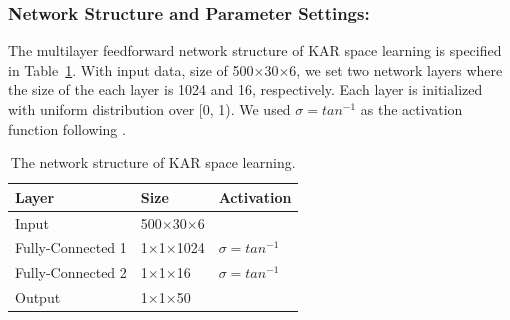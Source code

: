 \documentclass{sig-alternate-05-2015}
\begin{document}
\subsubsection{Network Structure and Parameter Settings:}
The multilayer feedforward network structure of KAR space learning is specified in Table~\ref{tab2}. With input data, size of 500$\times$30$\times$6, we set two network layers where the size of the each layer is 1024 and 16, respectively. Each layer is initialized with uniform distribution over [0, 1). We used $\sigma = {tan}^{-1}$ as the activation function following \cite{toh2018analytic}.
\begin{table}
\centering
    \caption{The network structure of KAR space learning.}
    \label{tab2}
    \begin{tabular}{|l|l|l|} \hline
     Layer   & Size     & Activation \\ \hline
     Input   & 500$\times$30$\times$6 &            \\ \hline
     Fully-Connected 1 & 1$\times$1$\times$1024 & $\sigma = {tan}^{-1}$     \\ \hline
     Fully-Connected 2 & 1$\times$1$\times$16  & $\sigma = {tan}^{-1}$     \\ \hline
     Output  & 1$\times$1$\times$50   &            \\\hline
    \end{tabular}
\end{table}
\end{document}
